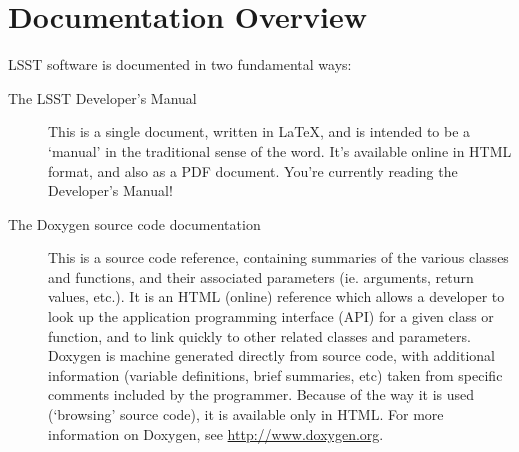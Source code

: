 
\renewcommand{\LaTeX}{LaTeX\xspace}

\newcommand{\tttex}{\texttt{.tex}\xspace}
\newcommand{\ttlsstpackages}{\texttt{lsstPackages.tex}\xspace}
\newcommand{\ttinput}{\texttt{\textbackslash input}\xspace}
\newcommand{\ttlsstmanual}{\texttt{lsstManual.tex}\xspace}
\newcommand{\ttdevenvdoc}{\texttt{devenv/doc}\xspace}
\newcommand{\tteups}{\texttt{eups}\xspace}
\newcommand{\ttsetup}{\texttt{setup}\xspace}
\newcommand{\ttscons}{\texttt{scons}\xspace}
\newcommand{\ttlsstinput}{\texttt{\textbackslash lsstinput}\xspace}
\newcommnad{\ttlatex2html}{\texttt{latex2html}\xspace}

\newcommand{\ttdoxygenconf}{\texttt{doxgyen.conf}\xspace}

\section{Documentation Overview\label{sec-doc-overview}}

LSST software is documented in two fundamental ways:

\begin{description}
  
\item[The LSST Developer's Manual] This is a single document,
  written in \LaTeX, and is intended to be a `manual' in the traditional
  sense of the word.  It's available online in HTML format, and also
  as a PDF document. You're currently reading the Developer's Manual!

\item[The Doxygen source code documentation] This is a source code
  reference, containing summaries of the various classes and
  functions, and their associated parameters (ie. arguments, return
  values, etc.).  It is an HTML (online) reference which allows a
  developer to look up the application programming interface (API) for
  a given class or function, and to link quickly to other related
  classes and parameters.  Doxygen is machine generated directly from
  source code, with additional information (variable definitions,
  brief summaries, etc) taken from specific comments included by the
  programmer. Because of the way it is used (`browsing' source code),
  it is available only in HTML.  For more information on Doxygen, see
  \url{http://www.doxygen.org}.
    
\end{description}


